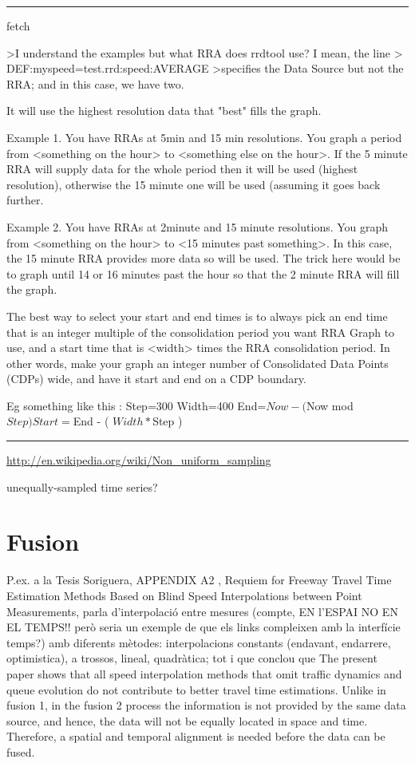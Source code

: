 \hrule


fetch

>I understand the examples but what RRA does rrdtool use? I mean, the line
>     DEF:myspeed=test.rrd:speed:AVERAGE
>specifies the Data Source but not the RRA; and in this case, we have two.

It will use the highest resolution data that "best" fills the graph.

Example 1. You have RRAs at 5min and 15 min resolutions. You graph a 
period from <something on the hour> to <something else on the hour>. 
If the 5 minute RRA will supply data for the whole period then it 
will be used (highest resolution), otherwise the 15 minute one will 
be used (assuming it goes back further.

Example 2.
You have RRAs at 2minute and 15 minute resolutions. You graph from 
<something on the hour> to <15 minutes past something>. In this case, 
the 15 minute RRA provides more data so will be used. The trick here 
would be to graph until 14 or 16 minutes past the hour so that the 2 
minute RRA will fill the graph.

The best way to select your start and end times is to always pick an 
end time that is an integer multiple of the consolidation period you 
want RRA Graph to use, and a start time that is <width> times the RRA 
consolidation period. In other words, make your graph an integer 
number of Consolidated Data Points (CDPs) wide, and have it start and 
end on a CDP boundary.

Eg something like this :
Step=300
Width=400
End=$Now - ( $Now mod $Step)
Start=$End - ( $Width * $Step )



\hrule


\url{http://en.wikipedia.org/wiki/Non_uniform_sampling}

unequally-sampled time series?



\section{Fusion}



 P.ex. a la Tesis Soriguera, APPENDIX A2 , 
Requiem for Freeway Travel Time Estimation Methods Based
on Blind Speed Interpolations between Point Measurements, parla d'interpolació entre mesures (compte, EN l'ESPAI NO EN EL TEMPS!! però seria un exemple de que els links compleixen amb la interfície temps?) amb diferents mètodes:  interpolacions constants (endavant, endarrere, optimistica), a trossos, lineal, quadràtica;    tot i que conclou que The present paper shows that all speed interpolation methods that omit traffic
dynamics and queue evolution do not contribute to better travel time estimations. 
Unlike in fusion 1, in the fusion 2 process the information is not provided by the same
data source, and hence, the data will not be equally located in space and time. 
Therefore, a spatial and temporal alignment is needed before the data can be fused.


